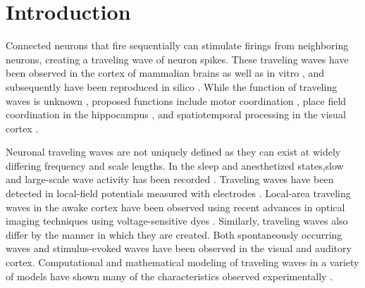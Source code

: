 \documentclass[12pt]{article}
\begin{document}
\section{Introduction} 
Connected neurons that fire sequentially can stimulate firings from neighboring neurons, creating a traveling wave of neuron spikes. 
These traveling waves have been observed in the cortex of mammalian brains \parencite{Muller2018}\parencite{reimer2010}  as well as in vitro \parencite{wu2008}\parencite{huang2004}\parencite{Golomb1999}, and subsequently have been reproduced in silico \parencite{keane2015}\parencite{Senk2020}\color{red}\parencite{Golomb1996}\parencite{ermentrout2001}\color{black}. 
While the function of traveling waves is unknown \parencite{wu2008}\parencite{Muller2018}, proposed functions include motor coordination \color{red}\parencite{Rubino2006}\color{black} , place field coordination in the hippocampus \parencite{lubernov2009}, and spatiotemporal processing in the visual cortex \parencite{wu2008}\parencite{Muller2014}.

Neuronal traveling waves are not uniquely defined as they can exist at widely differing frequency and scale lengths.  
In the sleep and anesthetized states,slow and large-scale wave activity has been recorded \parencite{Muller2018}. 
Traveling waves have been detected in local-field potentials measured with electrodes \cite{Rubino2006}\parencite{sanes1993}\color{red}\parencite{Riehle2013}\color{black}.
Local-area traveling waves in the awake cortex have been observed using recent advances in optical imaging techniques using voltage-sensitive dyes \parencite{wu2008}\parencite{Shoham1999}\color{red}\parencite{Xu2007}\parencite{Ferezou2006}\color{black}.  
Similarly, traveling waves also differ by the manner in which they are created. 
Both spontaneously occurring waves and stimulus-evoked \parencite{reimer2010} waves have been observed in the visual and auditory cortex. 
Computational and mathematical modeling of traveling waves in a variety of models have shown many of the characteristics observed experimentally \parencite{ermentrout2001}\parencite{keane2015}\parencite{gibson2009}.
\end{document}
